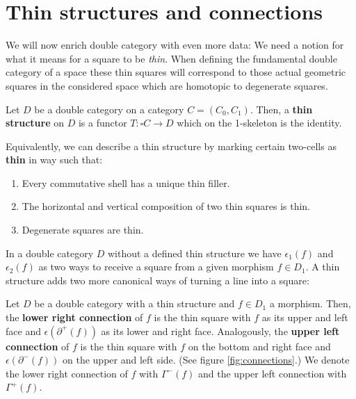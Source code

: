 \section{Thin structures and connections}

We will now enrich double category with even more data: We need a notion for
what it means for a square to be \emph{thin}. When defining the fundamental double
category of a space these thin squares will correspond to those actual geometric
squares in the considered space which are homotopic to degenerate squares.

\begin{defn} \label{def:thin-structure}
Let $D$ be a double category on a category $C = (C_0, C_1)$. Then, a \textbf{thin
structure} on $D$ is a functor $T : \square C \to D$ which on the 1-skeleton is the
identity.

Equivalently, we can describe a thin structure by marking certain two-cells as
\textbf{thin} in way such that:
\begin{enumerate}
\item Every commutative shell has a unique thin filler.
\item The horizontal and vertical composition of two thin squares is thin.
\item Degenerate squares are thin.
\end{enumerate}
\end{defn}

In a double category $D$ without a defined thin structure we have
$\epsilon_1(f)$ and $\epsilon_2(f)$ as two ways to receive a square from a given
morphism $f \in D_1$. A thin structure adds two more canonical ways of turning
a line into a square:

\begin{defn} \label{def:connections}
Let $D$ be a double category with a thin structure and $f \in D_1$ a morphism.
Then, the \textbf{lower right connection} of $f$ is the thin square with $f$ 
as its upper and left face and $\epsilon(\partial^+(f))$ as its lower and right face.
Analogously, the \textbf{upper left connection} of $f$ is the thin square with
$f$ on the bottom and right face and $\epsilon(\partial^-(f))$ on the upper and
left side. (See figure \ref{fig:connections}.)
We denote the lower right connection of $f$ with $\Gamma^-(f)$ and the upper left
connection with $\Gamma^+(f)$.
\end{defn}


